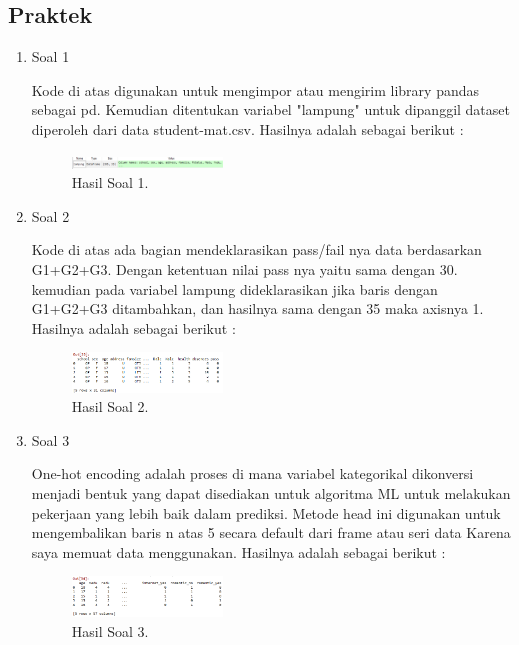 \subsection{Praktek}
\begin{enumerate}
	\item Soal 1
	\hfill\break
	
	Kode di atas digunakan untuk mengimpor atau mengirim library pandas sebagai pd. Kemudian ditentukan variabel "lampung" untuk dipanggil dataset diperoleh dari data student-mat.csv. Hasilnya adalah sebagai berikut :
	\begin{figure}[H]
	\centering
		\includegraphics[width=4cm]{figures/1174017/2/hasilsoal1.PNG}
		\caption{Hasil Soal 1.}
	\end{figure}

	\item Soal 2
	\hfill\break
	
	Kode di atas ada bagian mendeklarasikan pass/fail nya data berdasarkan G1+G2+G3. Dengan ketentuan nilai pass nya yaitu sama dengan 30. kemudian pada variabel lampung dideklarasikan jika baris dengan G1+G2+G3 ditambahkan, dan hasilnya sama dengan 35 maka axisnya 1. Hasilnya adalah sebagai berikut :
	\begin{figure}[H]
	\centering
		\includegraphics[width=4cm]{figures/1174017/2/hasilsoal2.PNG}
		\caption{Hasil Soal 2.}
	\end{figure}
	
	\item Soal 3
	\hfill\break
	
	One-hot encoding adalah proses di mana variabel kategorikal dikonversi menjadi bentuk yang dapat disediakan untuk algoritma ML untuk melakukan pekerjaan yang lebih baik dalam prediksi. Metode head ini digunakan untuk mengembalikan baris n atas 5 secara default dari frame atau seri data Karena saya memuat data menggunakan. Hasilnya adalah sebagai berikut :
	\begin{figure}[H]
	\centering
		\includegraphics[width=4cm]{figures/1174017/2/hasilsoal3.PNG}
		\caption{Hasil Soal 3.}
	\end{figure}


\end{enumerate}
